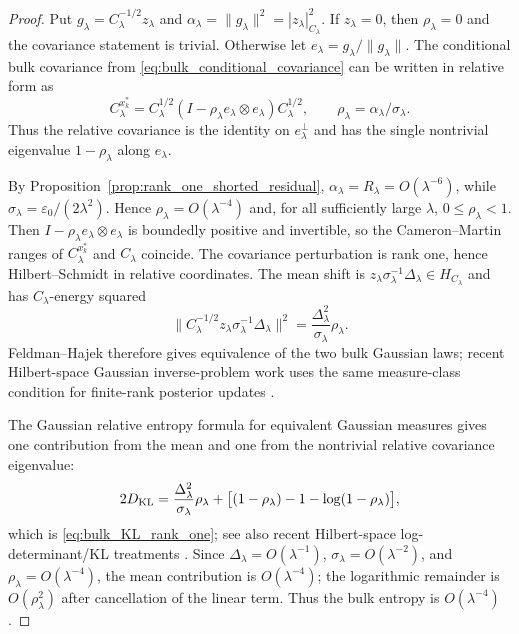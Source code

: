 \begin{proof}
Put $g_\lambda=C_\lambda^{-1/2}z_\lambda$ and
$\alpha_\lambda=\|g_\lambda\|^2=|z_\lambda|_{C_\lambda}^2$.  If
$z_\lambda=0$, then $\rho_\lambda=0$ and the covariance statement is trivial.
Otherwise let $e_\lambda=g_\lambda/\|g_\lambda\|$.  The conditional bulk
covariance from \eqref{eq:bulk_conditional_covariance} can be written in
relative form as
\begin{equation}
  C_\lambda^{x_k^*}
  =C_\lambda^{1/2}
    (I-\rho_\lambda e_\lambda\otimes e_\lambda)
    C_\lambda^{1/2},
  \qquad
  \rho_\lambda=\alpha_\lambda/\sigma_\lambda.
  \label{eq:relative_rank_one_covariance}
\end{equation}
Thus the relative covariance is the identity on
$e_\lambda^\perp$ and has the single nontrivial eigenvalue
$1-\rho_\lambda$ along $e_\lambda$.

By Proposition~\ref{prop:rank_one_shorted_residual},
$\alpha_\lambda=R_\lambda=O(\lambda^{-6})$, while
$\sigma_\lambda=\varepsilon_0/(2\lambda^2)$.  Hence
$\rho_\lambda=O(\lambda^{-4})$ and, for all sufficiently large $\lambda$,
$0\le\rho_\lambda<1$.  Then
$I-\rho_\lambda e_\lambda\otimes e_\lambda$ is boundedly positive and invertible,
so the Cameron--Martin ranges of $C_\lambda^{x_k^*}$ and $C_\lambda$ coincide.
The covariance perturbation is rank one, hence Hilbert--Schmidt in relative
coordinates.  The mean shift is
$z_\lambda\sigma_\lambda^{-1}\Delta_\lambda\in H_{C_\lambda}$ and has
$C_\lambda$-energy squared
\[
  \bigl\|C_\lambda^{-1/2}z_\lambda\sigma_\lambda^{-1}\Delta_\lambda\bigr\|^2
  =\frac{\Delta_\lambda^2}{\sigma_\lambda}\rho_\lambda.
\]
Feldman--Hajek therefore gives equivalence of the two bulk Gaussian laws; recent Hilbert-space Gaussian inverse-problem work uses the same measure-class condition for finite-rank posterior updates \cite{carerelie2024covariance,carerelie2025mean}.

The Gaussian relative entropy formula for equivalent Gaussian measures gives
one contribution from the mean and one from the nontrivial relative covariance
eigenvalue:
\[
  2D_{\operatorname{KL}}
  =
  \frac{\Delta_\lambda^2}{\sigma_\lambda}\rho_\lambda
  +\bigl[(1-\rho_\lambda)-1-\log(1-\rho_\lambda)\bigr],
\]
which is \eqref{eq:bulk_KL_rank_one}; see also recent Hilbert-space log-determinant/KL treatments \cite{quang2022kl,carerelie2024covariance}.  Since
$\Delta_\lambda=O(\lambda^{-1})$, $\sigma_\lambda=O(\lambda^{-2})$, and
$\rho_\lambda=O(\lambda^{-4})$, the mean contribution is $O(\lambda^{-4})$;
the logarithmic remainder is $O(\rho_\lambda^2)$ after cancellation of the
linear term.  Thus the bulk entropy is $O(\lambda^{-4})$.
\end{proof}

